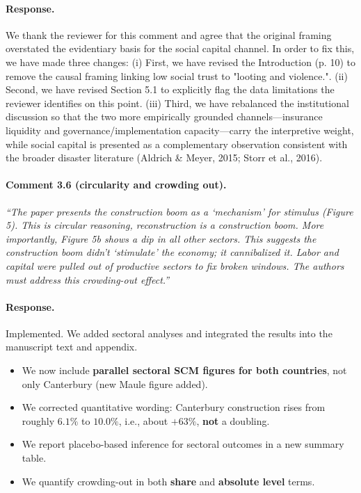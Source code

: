 \paragraph{Response.} We thank the reviewer for this comment and agree that the original framing overstated the evidentiary basis for the social capital channel. In order to fix this, we have made three changes: (i) First, we have revised the Introduction (p. 10) to remove the causal framing linking low social trust to "looting and violence.". (ii) Second, we have revised Section 5.1 to explicitly flag the data limitations the reviewer identifies on this point. (iii) Third, we have rebalanced the institutional discussion so that the two more empirically grounded channels—insurance liquidity and governance/implementation capacity—carry the interpretive weight, while social capital is presented as a complementary observation consistent with the broader disaster literature (Aldrich \& Meyer, 2015; Storr et al., 2016).

\paragraph{Comment 3.6 (circularity and crowding out).}
\textit{``The paper presents the construction boom as a `mechanism' for stimulus (Figure 5). This is circular reasoning, reconstruction is a construction boom. More importantly, Figure 5b shows a dip in all other sectors. This suggests the construction boom didn't `stimulate' the economy; it cannibalized it. Labor and capital were pulled out of productive sectors to fix broken windows. The authors must address this crowding-out effect.''}

\paragraph{Response.}
Implemented. We added sectoral analyses and integrated the results into the manuscript text and appendix.

\begin{itemize}
  \item We now include \textbf{parallel sectoral SCM figures for both countries}, not only Canterbury (new Maule figure added).
  \item We corrected quantitative wording: Canterbury construction rises from roughly \(6.1\%\) to \(10.0\%\), i.e., about \(+63\%\), \textbf{not} a doubling.
  \item We report placebo-based inference for sectoral outcomes in a new summary table.
  \item We quantify crowding-out in both \textbf{share} and \textbf{absolute level} terms.
\end{itemize}

